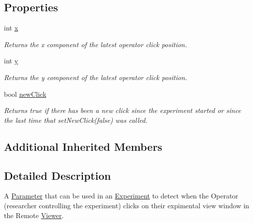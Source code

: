 \subsection*{Properties}
\begin{DoxyCompactItemize}
\item 
int \hyperlink{class_picto_1_1_operator_click_parameter_ae3ad1a093171b31403f106f5f2d5a6ce}{x}
\begin{DoxyCompactList}\small\item\em Returns the x component of the latest operator click position. \end{DoxyCompactList}\item 
int \hyperlink{class_picto_1_1_operator_click_parameter_af9d7ea6a7c1ff91c8d151ca76baf3fc5}{y}
\begin{DoxyCompactList}\small\item\em Returns the y component of the latest operator click position. \end{DoxyCompactList}\item 
bool \hyperlink{class_picto_1_1_operator_click_parameter_aa9b971f847135a7a4c1d8d2f823f75ab}{new\-Click}
\begin{DoxyCompactList}\small\item\em Returns true if there has been a new click since the experiment started or since the last time that set\-New\-Click(false) was called. \end{DoxyCompactList}\end{DoxyCompactItemize}
\subsection*{Additional Inherited Members}


\subsection{Detailed Description}
A \hyperlink{class_picto_1_1_parameter}{Parameter} that can be used in an \hyperlink{class_picto_1_1_experiment}{Experiment} to detect when the Operator (researcher controlling the experiment) clicks on their expimental view window in the Remote \hyperlink{class_viewer}{Viewer}. 

